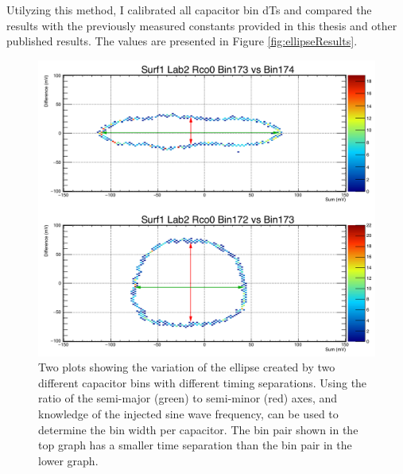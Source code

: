		Utilyzing this method, I calibrated all capacitor bin dTs and compared the results with the previously measured constants provided in this thesis and other published results\cite{BenSThesis}.  The values are presented in Figure \ref{fig:ellipseResults}.
		
	\begin{figure}
		\includegraphics[width=\textwidth]{figures/ellipseMethodExample2_arrows}
		\caption{Two plots showing the variation of the ellipse created by two different capacitor bins with different timing separations.  Using the ratio of the semi-major (green) to semi-minor (red) axes, and knowledge of the injected sine wave frequency, can be used to determine the bin width per capacitor.  The bin pair shown in the top graph has a smaller time separation than the bin pair in the lower graph.}
		\label{fig:ellipseMethodExample}
	\end{figure}

